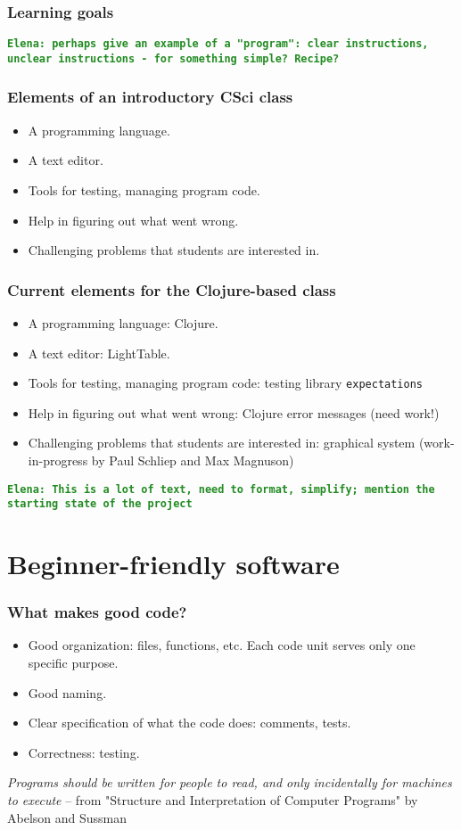 \documentclass{beamer}
\newcommand{\comment}[1]{{\bf \tt  {#1}}}
\newcommand{\emcomment}[1]{\textcolor{ForestGreen}{\comment{Elena: {#1}}}}
\begin{document}
\begin{frame}[fragile]
\frametitle{Learning goals}
\emcomment{perhaps give an example of a "program": clear instructions, unclear instructions - for something simple? Recipe?}
\end{frame}

\begin{frame}[fragile]
\frametitle{Elements of an introductory CSci class}
\begin{itemize}
\item A programming language. 
\item A text editor.
\item Tools for testing, managing program code. 
\item Help in figuring out what went wrong.
\item Challenging problems that students are interested in.
\end{itemize}
\end{frame}

\begin{frame}[fragile]
\frametitle{Current elements for the Clojure-based class}
\begin{itemize}
\item A programming language: Clojure. 
\item A text editor: LightTable.
\item Tools for testing, managing program code: testing library {\tt expectations}
\item Help in figuring out what went wrong: Clojure error messages (need work!)
\item Challenging problems that students are interested in: graphical system (work-in-progress by Paul Schliep and Max Magnuson)
\end{itemize}
\emcomment{This is a lot of text, need to format, simplify; mention the starting state of the project}
\end{frame}

\section{Beginner-friendly software}

\begin{frame}[fragile]
\frametitle{What makes good code?}

\begin{itemize}
\item Good organization: files, functions, etc. Each code unit serves only one specific purpose. 
\item Good naming.
\item Clear specification of what the code does: comments, tests.
\item Correctness: testing. 
\end{itemize}
{\it Programs should be written for people to read, and only incidentally for machines to execute} --	 
from "Structure and Interpretation of Computer Programs" by Abelson and Sussman	
\end{frame}
\end{document}
